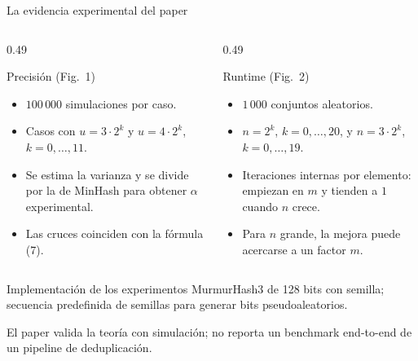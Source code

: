 \documentclass[aspectratio=169,11pt]{beamer}
\begin{document}
\begin{frame}{La evidencia experimental del paper}
  \begin{columns}[T]
    \begin{column}{0.49\textwidth}
      \begin{block}{Precisi\'on (Fig.~1)}
        \footnotesize
        \begin{itemize}
          \item $100\,000$ simulaciones por caso.
          \item Casos con $u=3\cdot2^k$ y $u=4\cdot2^k$, $k=0,\ldots,11$.
          \item Se estima la varianza y se divide por la de MinHash para
                obtener $\alpha$ experimental.
          \item Las cruces coinciden con la f\'ormula (7).
        \end{itemize}
      \end{block}
    \end{column}
    \begin{column}{0.49\textwidth}
      \begin{block}{Runtime (Fig.~2)}
        \footnotesize
        \begin{itemize}
          \item $1\,000$ conjuntos aleatorios.
          \item $n=2^k$, $k=0,\ldots,20$, y $n=3\cdot2^k$,
                $k=0,\ldots,19$.
          \item Iteraciones internas por elemento: empiezan en $m$ y
                tienden a $1$ cuando $n$ crece.
          \item Para $n$ grande, la mejora puede acercarse a un factor $m$.
        \end{itemize}
      \end{block}
    \end{column}
  \end{columns}
  \vfill
  \begin{block}{Implementaci\'on de los experimentos}
    \centering
    \small
    MurmurHash3 de 128 bits con semilla; secuencia predefinida de semillas
    para generar bits pseudoaleatorios.
  \end{block}
  \vspace{0.3em}
  \footnotesize
  El paper valida la teor\'ia con simulaci\'on; no reporta un benchmark
  end-to-end de un pipeline de deduplicaci\'on.
\end{frame}
\end{document}
